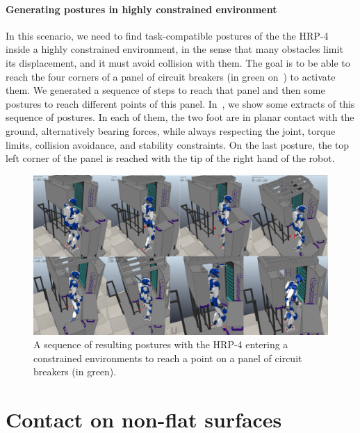 \paragraph{Generating postures in highly constrained environment}
In this scenario, we need to find task-compatible postures of the the HRP-4 inside a highly constrained environment, in the sense that many obstacles limit its displacement, and it must avoid collision with them.
The goal is to be able to reach the four corners of a panel of circuit breakers (in green on~) to activate them.
We generated a sequence of steps to reach that panel and then some postures to reach different points of this panel.
In~, we show some extracts of this sequence of postures.
In each of them, the two foot are in planar contact with the ground, alternatively bearing forces, while always respecting the joint, torque limits, collision avoidance, and stability constraints.
On the last posture, the top left corner of the panel is reached with the tip of the right hand of the robot.
\begin{figure}
  \centering
  \includegraphics[width=\linewidth]{getafeSequence.png}
  \caption{A sequence of resulting postures with the HRP-4 entering a constrained environments to reach a point on a panel of circuit breakers (in green).}
\label{fig:getafe}
\end{figure}


\section{Contact on non-flat surfaces}
\label{sec:contact_on_non_flat_surfaces}

